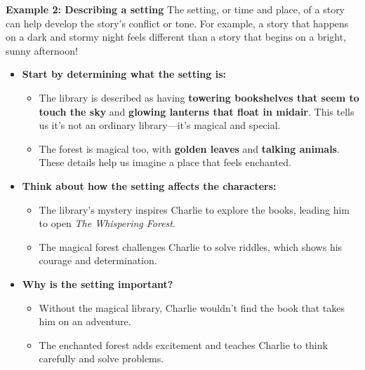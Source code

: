 \documentclass[12pt]{article}
\begin{document}
\begin{tcolorbox}[colframe=black!60, colback=white, 
coltitle=black, colbacktitle=black!15, fonttitle=\bfseries\Large, 
title=Examples, halign title=center, left=10pt, right=10pt, top=10pt, bottom=15pt]

\textbf{Example 2: Describing a setting}
The setting, or time and place, of a story can help develop the story's conflict or tone. For example, a story that happens on a dark and stormy night feels different than a story that begins on a bright, sunny afternoon!  
\begin{itemize}
    \item \textbf{Start by determining what the setting is:}
    \begin{itemize}
        \item The library is described as having \textbf{towering bookshelves that seem to touch the sky} and \textbf{glowing lanterns that float in midair}. This tells us it’s not an ordinary library—it’s magical and special.
    \end{itemize}
    \begin{itemize}
        \item The forest is magical too, with \textbf{golden leaves} and \textbf{talking animals}. These details help us imagine a place that feels enchanted.
    \end{itemize}
   \item \textbf{Think about how the setting affects the characters:}
    \begin{itemize}
        \item The library’s mystery inspires Charlie to explore the books, leading him to open \textit{The Whispering Forest}.
    \end{itemize}
    \begin{itemize}
        \item The magical forest challenges Charlie to solve riddles, which shows his courage and determination.
    \end{itemize}
   \item \textbf{Why is the setting important?}
    \begin{itemize}
        \item Without the magical library, Charlie wouldn’t find the book that takes him on an adventure.
    \end{itemize}
    \begin{itemize}
        \item The enchanted forest adds excitement and teaches Charlie to think carefully and solve problems.
    \end{itemize}
   \end{itemize}



 





 





     \end{tcolorbox}
\vspace{1em}
\end{document}

